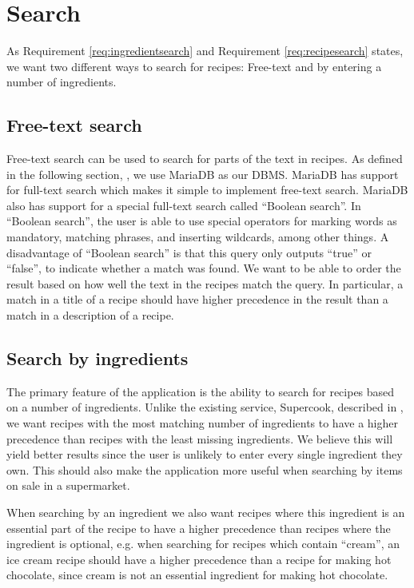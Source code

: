 \section{Search}\label{sec:design_search}

As Requirement \ref{req:ingredientsearch} and Requirement \ref{req:recipesearch} states, we want two different ways to search for recipes: Free-text and by entering a number of ingredients.

\subsection*{Free-text search}
Free-text search can be used to search for parts of the text in recipes. As defined in the following section, , we use MariaDB as our DBMS. MariaDB has support for full-text search which makes it simple to implement free-text search. MariaDB also has support for a special full-text search called ``Boolean search''. In ``Boolean search'', the user is able to use special operators for marking words as mandatory, matching phrases, and inserting wildcards, among other things. A disadvantage of ``Boolean search'' is that this query only outputs ``true'' or ``false'', to indicate whether a match was found. We want to be able to order the result based on how well the text in the recipes match the query. In particular, a match in a title of a recipe should have higher precedence in the result than a match in a description of a recipe.

\subsection*{Search by ingredients}
The primary feature of the application is the ability to search for recipes based on a number of ingredients. Unlike the existing service, Supercook, described in , we want recipes with the most matching number of ingredients to have a higher precedence than recipes with the least missing ingredients. We believe this will yield better results since the user is unlikely to enter every single ingredient they own. This should also make the application more useful when searching by items on sale in a supermarket.

 When searching by an ingredient we also want recipes where this ingredient is an essential part of the recipe to have a higher precedence than recipes where the ingredient is optional, e.g. when searching for recipes which contain ``cream'', an ice cream recipe should have a higher precedence than a recipe for making hot chocolate, since cream is not an essential ingredient for making hot chocolate.

